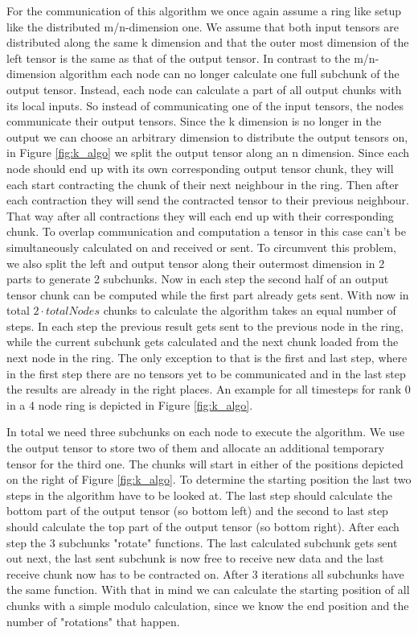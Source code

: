 For the communication of this algorithm we once again assume a ring like setup like the distributed m/n-dimension one.
We assume that both input tensors are distributed along the same k dimension and that the outer most dimension of the left tensor is the same as that of the output tensor.
In contrast to the m/n-dimension algorithm each node can no longer calculate one full subchunk of the output tensor.
Instead, each node can calculate a part of all output chunks with its local inputs.
So instead of communicating one of the input tensors, the nodes communicate their output tensors.
Since the k dimension is no longer in the output we can choose an arbitrary dimension to distribute the output tensors on, in Figure \ref{fig:k_algo} we split the output tensor along an n dimension.
Since each node should end up with its own corresponding output tensor chunk, they will each start contracting the chunk of their next neighbour in the ring.
Then after each contraction they will send the contracted tensor to their previous neighbour.
That way after all contractions they will each end up with their corresponding chunk.
To overlap communication and computation a tensor in this case can't be simultaneously calculated on and received or sent.
To circumvent this problem, we also split the left and output tensor along their outermost dimension in 2 parts to generate 2 subchunks.
Now in each step the second half of an output tensor chunk can be computed while the first part already gets sent.
With now in total $2 \cdot totalNodes$ chunks to calculate the algorithm takes an equal number of steps.
In each step the previous result gets sent to the previous node in the ring, while the current subchunk gets calculated and the next chunk loaded from the next node in the ring.
The only exception to that is the first and last step, where in the first step there are no tensors yet to be communicated and in the last step the results are already in the right places.
An example for all timesteps for rank 0 in a 4 node ring is depicted in Figure \ref{fig:k_algo}.

In total we need three subchunks on each node to execute the algorithm.
We use the output tensor to store two of them and allocate an additional temporary tensor for the third one.
The chunks will start in either of the positions depicted on the right of Figure \ref{fig:k_algo}.
To determine the starting position the last two steps in the algorithm have to be looked at.
The last step should calculate the bottom part of the output tensor (so bottom left) and the second to last step should calculate the top part of the output tensor (so bottom right).
After each step the 3 subchunks "rotate" functions.
The last calculated subchunk gets sent out next, the last sent subchunk is now free to receive new data and the last receive chunk now has to be contracted on.
After 3 iterations all subchunks have the same function.
With that in mind we can calculate the starting position of all chunks with a simple modulo calculation, since we know the end position and the number of "rotations" that happen.

